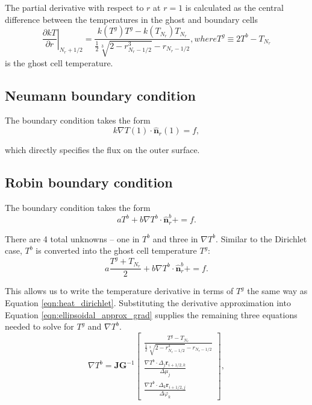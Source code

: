 The partial derivative with respect to $r$ at $r = 1$ is calculated as the central difference between the temperatures in the ghost and boundary cells
\begin{subequations}
    \label{eqn:heat_dirichlet}
    \begin{equation}
        \left. \frac{\partial kT}{\partial r} \right|_{N_r+1/2} = \frac{k(T^g)T^g - k(T_{N_r})T_{N_r}}{\frac{1}{2} \sqrt[3]{2 - r_{N_r - 1/2}^3} - r_{N_r - 1/2}},
        \label{eqn:heat_dirichlet}
    \end{equation}
    where
    \begin{equation}
        T^g \equiv 2T^b - T_{N_r}
    \end{equation}
\end{subequations}
is the ghost cell temperature.

\subsection{Neumann boundary condition}
The boundary condition takes the form
\begin{equation}
    k \nabla T (1) \cdot \mathbf{\hat{n}}_r(1) = f,
\end{equation}

which directly specifies the flux on the outer surface.

\subsection{Robin boundary condition}
The boundary condition takes the form
\begin{equation}
    a T^b + b\nabla T^b \cdot \mathbf{\hat{n}}_r^b +  = f.
\end{equation}

There are 4 total unknowns -- one in $T^b$ and three in $\nabla T^b$. Similar to the Dirichlet case, $T^b$ is converted into the ghost cell temperature $T^g$:
\begin{equation}
    a \frac{T^g + T_{N_r}}{2} + b\nabla T^b \cdot \mathbf{\hat{n}}_r^b +  = f.
\end{equation}

This allows us to write the temperature derivative in terms of $T^g$ the same way as Equation \ref{eqn:heat_dirichlet}. Substituting the derivative approximation into Equation \ref{eqn:ellipsoidal_approx_grad}
supplies the remaining three equations needed to solve for $T^g$ and $\nabla T^b$.
\begin{equation}
    \nabla T^b = \mathbf{J} \mathbf{G}^{-1}
    \begin{bmatrix}
        \displaystyle \frac{ T^g - T_{N_r} }{ \frac{1}{2} \sqrt[3]{2 - r_{N_r - 1/2}^3} - r_{N_r - 1/2} } \\
        \displaystyle \frac{ \nabla T^b \cdot \Delta_j \mathbf{r}_{i+1/2,k} }{\Delta \mu_j} \\
        \displaystyle \frac{ \nabla T^b \cdot \Delta_k \mathbf{r}_{i+1/2,j} }{\Delta \varphi_k}
    \end{bmatrix},
    \label{eqn:eqn:heat_robin_gradTb}
\end{equation}

